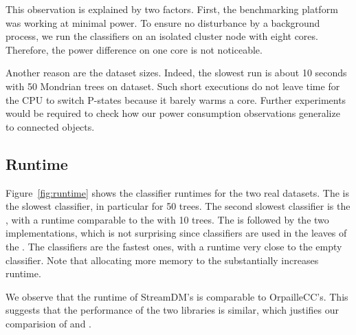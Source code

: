 This observation is explained by two factors. First, the benchmarking
platform was  working at minimal power. To ensure no disturbance by a
background process, we run the classifiers on an isolated cluster node with
eight cores. Therefore, the power difference on one core is not noticeable.

Another reason are the dataset sizes. Indeed, the slowest run is about
10 seconds with 50 Mondrian trees on \recofitdataset dataset. Such short
executions do not leave time for the CPU to switch P-states because it
barely warms a core. Further experiments would be required to check how 
our power consumption observations generalize to 
connected objects. 

\subsection{Runtime}

Figure~\ref{fig:runtime} shows the classifier runtimes for the two real
datasets. The \mondrianforest is the slowest classifier, in particular for 50
trees. The second slowest classifier is the \hoeffdingtree, with a runtime
comparable to the \mondrianforest with 10 trees. The \hoeffdingtree is followed
by the two \naivebayes implementations, which is not surprising since
\naivebayes classifiers are used in the leaves of the \hoeffdingtree. The \mcnn
classifiers are the fastest ones, with a runtime very close to the empty
classifier. Note that allocating more memory to the \mondrianforest
substantially increases runtime.

We observe that the runtime of StreamDM's \naivebayes is comparable to
OrpailleCC's. This suggests that the performance of the two libraries is
similar, which justifies our comparision of \hoeffdingtree and \mondrianforest.

